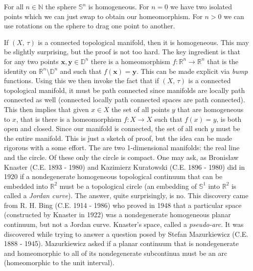 \documentclass{article}
\theoremstyle{plain}
\theoremstyle{normal}
\newenvironment{example}{%
    \pushQED{\qed}\renewcommand{\qedsymbol}{$\blacksquare$}\examplex%
}{%
    \popQED\endexamplex%
}
\begin{document}
        \begin{example}
            For all $n\in\mathbb{N}$ the sphere $\mathbb{S}^{n}$ is homogeneous.
            For $n=0$ we have two isolated points which we can just swap to
            obtain our homeomorphism. For $n>0$ we can use rotations on the
            sphere to drag one point to another.
        \end{example}
        \begin{example}
            If $(X,\,\tau)$ is a connected topological manifold, then it is
            homogeneous. This may be slightly surprising, but the proof is not
            too hard. The key ingredient is that for any two points
            $\mathbf{x},\mathbf{y}\in\mathbb{D}^{n}$ there is a homeomorphism
            $f:\mathbb{R}^{n}\rightarrow\mathbb{R}^{n}$ that is the identity
            on $\mathbb{R}^{n}\setminus\mathbb{D}^{n}$ and such that
            $f(\mathbf{x})=\mathbf{y}$. This can be made explicit via
            \textit{bump} functions. Using this we then invoke the fact that
            if $(X,\,\tau)$ is a connected topological manifold, it must be
            path connected since manifolds are locally path connected as well
            (connected locally path connected spaces are path connected).
            This then implies that given $x\in{X}$ the set of all points $y$
            that are homogeneous to
            $x$, that is there is a homeomorphism $f:X\rightarrow{X}$ such that
            $f(x)=y$, is both open and closed. Since our manifold is connected,
            the set of all such $y$ must be the entire manifold. This is just a
            sketch of proof, but the idea can be made rigorous with a some
            effort.
        \end{example}
        The are two 1-dimensional manifolds: the real line and the circle.
        Of these only the circle is compact. One may ask,
        as Bronis{\l}aw Knaster (C.E. 1893 - 1980) and Kazimierz Kuratowski
        (C.E. 1896 - 1980) did in 1920 if a nondegenerate homogeneous
        topological continuum that can be embedded into $\mathbb{R}^{2}$ must
        be a topological circle (an embedding of $\mathbb{S}^{1}$ into
        $\mathbb{R}^{2}$ is called a \textit{Jordan curve}).
        The answer, quite surprisingly, is no. This discovery came from
        R. H. Bing (C.E. 1914 - 1986) who proved in 1948 that a particular
        space (constructed by Knaster in 1922) was a nondegenerate homogeneous
        planar continuum, but not a Jordan curve. Knaster's space, called a
        \textit{pseudo-arc}. It was discovered while trying
        to answer a question posed by Stefan Mazurkiewicz (C.E. 1888 - 1945).
        Mazurkiewicz asked if a planar continuum that is nondegenerate and
        homeomorphic to all of its nondegenerate subcontinua must be an arc
        (homeomorphic to the unit interval).
    \printindex
\end{document}
